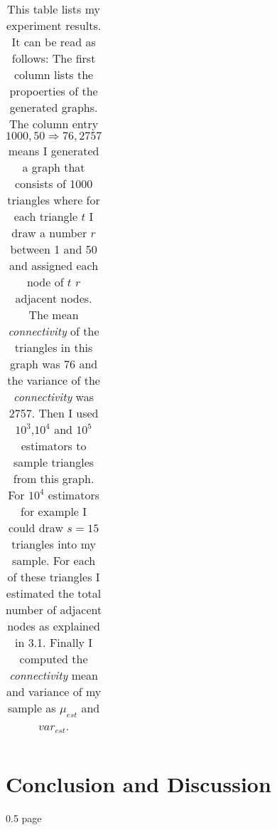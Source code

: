 \documentclass[12pt,twoside,a4paper]{report}
\begin{document}
\begin{center}
\begin{table}
{\begin{tabular}{l|c|c|c}
\end{tabular}
}
\caption{This table lists my experiment results. It can be read as follows: The first column lists the propoerties of the generated graphs. The column entry $1000, 50 \Rightarrow 76,2757$ means I generated a graph that consists of 1000 triangles where for each triangle $t$ I draw a number $r$ between 1 and 50 and assigned each node of $t$ $r$ adjacent nodes. The mean \textit{connectivity} of the triangles in this graph was 76 and the variance of the \textit{connectivity} was 2757. Then I used $10^3$,$10^4$ and $10^5$ estimators to sample triangles from this graph. For $10^4$ estimators for example I could draw $s=15$ triangles into my sample. For each of these triangles I estimated the total number of adjacent nodes as explained in 3.1. Finally I computed the \textit{connectivity} mean and variance of my sample as $\mu_{est}$ and $var_{est}$.}
\end{table}
\end{center}
\section{Conclusion and Discussion}
0.5 page

\end{document}
